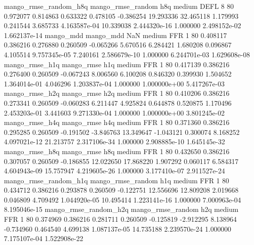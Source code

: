 mango_rmse_random_h8q mango_rmse_random                  h8q     medium     DEFL                 8 80  0.972077       0.814863 0.633322       0.478105   -0.386254     19.293336     32.465118     1.179993       0.241544  3.685733 4.163587e-04    10.339038   2.444320e-16            1.000000    2.498152e-02        1.662137e-14
            mango_mdd         mango_mdd                  NaN     medium      FFR                 1 80  0.408117       0.386216 0.276880       0.260509   -0.065266      5.670516      6.284421     1.680208       0.096867  4.105514 9.757345e-05     7.240161   2.586679e-10            1.000000    6.244701e-03        1.629608e-08
       mango_rmse_h1q        mango_rmse                  h1q     medium      FFR                 1 80  0.417139       0.386216 0.276400       0.260509   -0.067243      8.006560      6.100208     0.846320       0.399930  1.504652 1.364014e-01     4.046296   1.203837e-04            1.000000    1.000000e+00        5.417267e-03
       mango_rmse_h2q        mango_rmse                  h2q     medium      FFR                 1 80  0.410206       0.386216 0.273341       0.260509   -0.060283      6.211447      4.925824     0.644878       0.520875  1.170496 2.453203e-01     3.441603   9.271330e-04            1.000000    1.000000e+00        3.801245e-02
       mango_rmse_h4q        mango_rmse                  h4q     medium      FFR                 1 80  0.371360       0.386216 0.295285       0.260509   -0.191502     -3.846763     13.349647    -1.043121       0.300074  8.168252 4.097021e-12    21.213757   2.317106e-34            1.000000    2.908885e-10        1.645145e-32
       mango_rmse_h8q        mango_rmse                  h8q     medium      FFR                 1 80  0.432650       0.386216 0.307057       0.260509   -0.186855     12.022650     17.868220     1.907292       0.060117  6.584317 4.604943e-09    15.757947   4.219605e-26            1.000000    3.177410e-07        2.911527e-24
mango_rmse_random_h1q mango_rmse_random                  h1q     medium      FFR                 1 80  0.434712       0.386216 0.293878       0.260509   -0.122751     12.556696     12.809208     2.019668       0.046809  4.709492 1.044920e-05    10.495414   1.223141e-16            1.000000    7.000963e-04        8.195046e-15
mango_rmse_random_h2q mango_rmse_random                  h2q     medium      FFR                 1 80  0.374969       0.386216 0.281711       0.260509   -0.125819     -2.912295      8.138964    -0.734960       0.464540  4.699138 1.087137e-05    14.735188   2.239570e-24            1.000000    7.175107e-04        1.522908e-22
